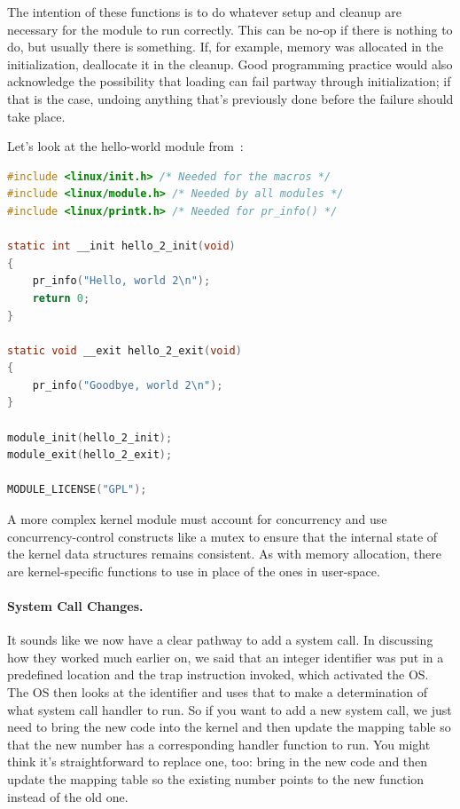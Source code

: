 The intention of these functions is to do whatever setup and cleanup are necessary for the module to run correctly. This can be no-op if there is nothing to do, but usually there is something. If, for example, memory was allocated in the initialization, deallocate it in the cleanup. Good programming practice would also acknowledge the possibility that loading can fail partway through initialization; if that is the case, undoing anything that's previously done before the failure should take place.

Let's look at the hello-world module from~\cite{pomerantz2000lkmpg}:
\begin{lstlisting}[language=C]
#include <linux/init.h> /* Needed for the macros */
#include <linux/module.h> /* Needed by all modules */
#include <linux/printk.h> /* Needed for pr_info() */

static int __init hello_2_init(void)
{
    pr_info("Hello, world 2\n");
    return 0;
}

static void __exit hello_2_exit(void)
{
    pr_info("Goodbye, world 2\n");
}

module_init(hello_2_init);
module_exit(hello_2_exit);

MODULE_LICENSE("GPL");
\end{lstlisting}

A more complex kernel module must account for concurrency and use concurrency-control constructs like a mutex to ensure that the internal state of the kernel data structures remains consistent. As with memory allocation, there are kernel-specific functions to use in place of the ones in user-space.

\paragraph{System Call Changes.} It sounds like we now have a clear pathway to add a system call. In discussing how they worked much earlier on, we said that an integer identifier was put in a predefined location and the trap instruction invoked, which activated the OS. The OS then looks at the identifier and uses that to make a determination of what system call handler to run. So if you want to add a new system call, we just need to bring the new code into the kernel and then update the mapping table so that the new number has a corresponding handler function to run. You might think it's straightforward to replace one, too: bring in the new code and then update the mapping table so the existing number points to the new function instead of the old one.

